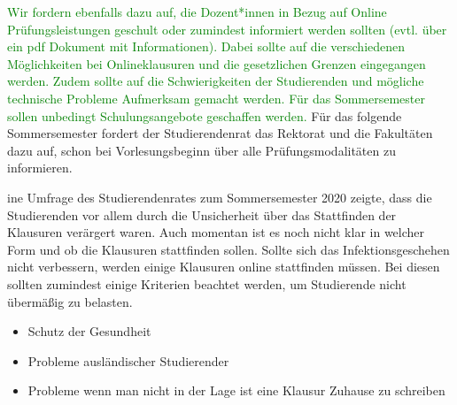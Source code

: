 {\begin{itemize}
        \end{itemize}
        \textcolor{green}{Wir fordern ebenfalls dazu auf, die Dozent*innen in Bezug auf Online
        Prüfungsleistungen geschult
        oder zumindest informiert werden sollten (evtl. über ein pdf Dokument mit
        Informationen). Dabei
        sollte auf die verschiedenen Möglichkeiten bei Onlineklausuren und die gesetzlichen
        Grenzen
        eingegangen werden. Zudem sollte auf die Schwierigkeiten der Studierenden und
        mögliche
        technische Probleme Aufmerksam gemacht werden. Für das Sommersemester sollen
        unbedingt
        Schulungsangebote geschaffen werden.}
        Für das folgende Sommersemester fordert der Studierendenrat das Rektorat und die
        Fakultäten dazu
        auf, schon bei Vorlesungsbeginn über alle Prüfungsmodalitäten zu informieren.
        }{
            ine Umfrage des Studierendenrates zum Sommersemester 2020 zeigte, dass die Studierenden vor
            allem durch die Unsicherheit über das Stattfinden der Klausuren verärgert waren. Auch momentan
            ist es noch nicht klar in welcher Form und ob die Klausuren stattfinden sollen.
            Sollte sich das Infektionsgeschehen nicht verbessern, werden einige Klausuren online stattfinden
            müssen. Bei diesen sollten zumindest einige Kriterien beachtet werden, um Studierende nicht
            übermäßig zu belasten.
            \begin{itemize}
                \item Schutz der Gesundheit
                \item Probleme ausländischer Studierender
                \item Probleme wenn man nicht in der Lage ist eine Klausur Zuhause zu schreiben
            \end{itemize}
        }{

        }{
        }
    {
        
    }{
    }{
    }{
    }
